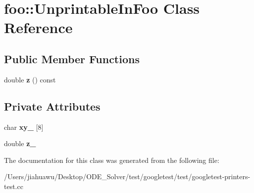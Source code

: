 \hypertarget{classfoo_1_1_unprintable_in_foo}{}\section{foo\+:\+:Unprintable\+In\+Foo Class Reference}
\label{classfoo_1_1_unprintable_in_foo}
\subsection*{Public Member Functions}
\begin{DoxyCompactItemize}
\item 
\mbox{\label{classfoo_1_1_unprintable_in_foo_a3dc8c8e90906bb6f3376474d545e488c}} 
double {\bfseries z} () const
\end{DoxyCompactItemize}
\subsection*{Private Attributes}
\begin{DoxyCompactItemize}
\item 
\mbox{\label{classfoo_1_1_unprintable_in_foo_a254a8fbb1e51db1ef98fadcad88e7819}} 
char {\bfseries xy\+\_\+} \mbox{[}8\mbox{]}
\item 
\mbox{\label{classfoo_1_1_unprintable_in_foo_a48136583cf853dcb112f46d33eb7b8eb}} 
double {\bfseries z\+\_\+}
\end{DoxyCompactItemize}


The documentation for this class was generated from the following file\+:\begin{DoxyCompactItemize}
\item 
/\+Users/jiahuawu/\+Desktop/\+O\+D\+E\+\_\+\+Solver/test/googletest/test/googletest-\/printers-\/test.\+cc\end{DoxyCompactItemize}
